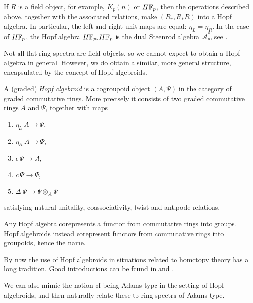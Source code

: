 \begin{remark}
    \label{ch0:rm:fields-give-hopf-algebras}
    If $R$ is a field object, for example, $K_p(n)$ or $H\mathbb{F}_p$, then the operations described above, together with the associated relations, make $(R_*, R_*R)$ into a Hopf algebra. In particular, the left and right unit maps are equal: $\eta_L=\eta_R$. In the case of $H\mathbb{F}_p$, the Hopf algebra $H\mathbb{F}_{p*}H\mathbb{F}_p$ is the dual Steenrod algebra $\mathcal{A}^*_p$, see \cite{milnor_1958}. 
\end{remark}

Not all flat ring spectra are field objects, so we cannot expect to obtain a Hopf algebra in general. However, we do obtain a similar, more general structure, encapsulated by the concept of Hopf algebroids.  

\begin{definition}
    \label{ch0:def:hopf-algebroid}
    A (graded) \emph{Hopf algebroid} is a cogroupoid object $(A, \Psi)$ in the category of graded commutative rings. More precisely it consists of two graded commutative rings $A$ and $\Psi$, together with maps 
    \begin{enumerate}
        \item $\eta_L\: A\longrightarrow \Psi$, 
        \item $\eta_R\: A\longrightarrow \Psi$,
        \item $\epsilon\: \Psi\longrightarrow A$,
        \item $c\: \Psi\longrightarrow \Psi$,
        \item $\Delta\: \Psi\longrightarrow \Psi\otimes_A\Psi$
    \end{enumerate}
    satisfying natural unitality, coassociativity, twist and antipode relations. 
\end{definition}

\begin{remark}
    Any Hopf algebra corepresents a functor from commutative rings into groups. Hopf algebroids instead corepresent functors from commutative rings into groupoids, hence the name. 
\end{remark}

By now the use of Hopf algebroids in situations related to homotopy theory has a long tradition. Good introductions can be found in \cite[A.1]{ravenel_86} and \cite{hovey_04}. 

We can also mimic the notion of being Adams type in the setting of Hopf algebroids, and then naturally relate these to ring spectra of Adams type. 

